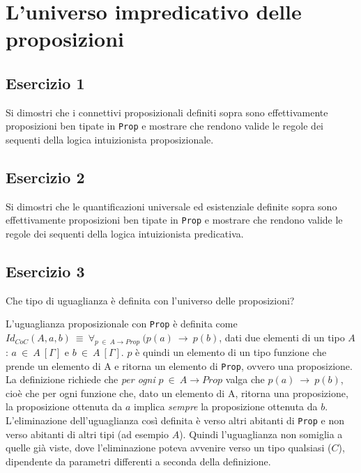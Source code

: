 \section{L'universo impredicativo delle proposizioni}
\subsection{Esercizio 1}
\begin{thm}
	Si dimostri che i connettivi proposizionali definiti sopra sono effettivamente proposizioni ben tipate in \texttt{Prop} e mostrare che rendono valide le regole dei sequenti della logica intuizionista proposizionale.
\end{thm}


\subsection{Esercizio 2}
\begin{thm}
	Si dimostri che le quantificazioni universale ed esistenziale definite sopra sono effettivamente proposizioni ben tipate in \texttt{Prop} e mostrare che rendono valide le regole dei sequenti della logica intuizionista predicativa.
\end{thm}


\subsection{Esercizio 3}
\begin{thm}
	Che tipo di uguaglianza è definita con l'universo delle proposizioni?
\end{thm}
L'uguaglianza proposizionale con \texttt{Prop} è definita come $Id_{CoC}(A,a,b)~\equiv~\forall_{p~\in~A\to Prop}~(p(a)~\to~p(b)$, dati due  elementi di un tipo $A$: $a~\in~A~[\Gamma]$ e $b~\in~A~[\Gamma]$. $p$ è quindi un elemento di un tipo funzione che prende un elemento di A e ritorna un elemento di \texttt{Prop}, ovvero una proposizione. La definizione richiede che \textit{per ogni} $p~\in~A\to Prop$ valga che $p(a)~\to~p(b)$, cioè che per ogni funzione che, dato un elemento di A, ritorna una proposizione, la proposizione ottenuta da $a$ implica \textit{sempre} la proposizione ottenuta da $b$. L'eliminazione dell'uguaglianza così definita è verso altri abitanti di \texttt{Prop} e non verso abitanti di altri tipi (ad esempio $A$). Quindi l'uguaglianza non somiglia a quelle già viste, dove l'eliminazione poteva avvenire verso un tipo qualsiasi ($C$), dipendente da parametri differenti a seconda della definizione.
